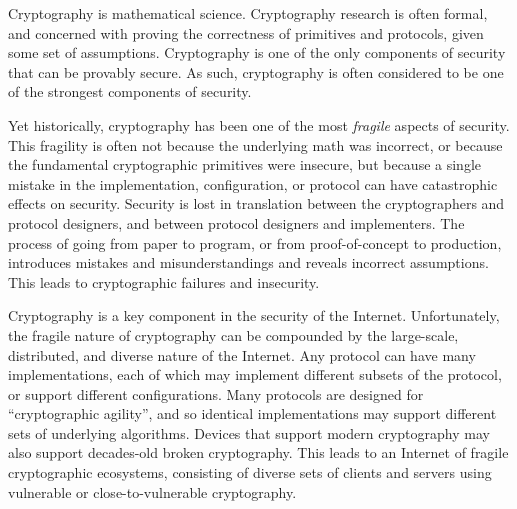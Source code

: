 
Cryptography is mathematical science. Cryptography research is often formal,
and concerned with proving the correctness of primitives and
protocols, given some set of assumptions. Cryptography is one of the only
components of security that can be provably secure. As such, cryptography is
often considered to be one of the strongest components of security.

Yet historically, cryptography has been one of the most \textit{fragile}
aspects of security. This fragility is often not because the underlying math
was incorrect, or because the fundamental cryptographic primitives were
insecure, but because a single mistake in the implementation, configuration,
or protocol can have catastrophic effects on security. Security is lost in
translation between the cryptographers and protocol designers, and between
protocol designers and implementers. The process of going from paper to
program, or from proof-of-concept to production, introduces mistakes and
misunderstandings and reveals incorrect assumptions. This leads to
cryptographic failures and insecurity.


Cryptography is a key component in the security of the Internet.
Unfortunately, the fragile nature of cryptography can be compounded by the
large-scale, distributed, and diverse nature of the Internet. Any protocol
can have many implementations, each of which may implement different subsets
of the protocol, or support different configurations. Many protocols are
designed for ``cryptographic agility'', and so identical implementations may
support different sets of underlying algorithms. Devices that support modern
cryptography may also support decades-old broken cryptography. This leads to
an Internet of fragile cryptographic ecosystems, consisting of diverse sets
of clients and servers using vulnerable or close-to-vulnerable cryptography.


